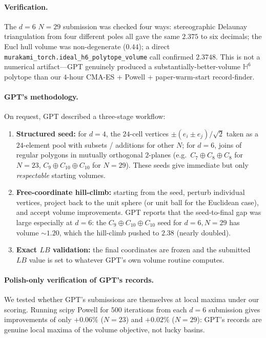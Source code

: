 \documentclass[11pt]{article}
\begin{document}
\paragraph{Verification.}
The $d = 6$ $N = 29$ submission was checked four ways: stereographic
Delaunay triangulation from four different poles all gave the same
$2.375$ to six decimals; the Eucl hull volume was non-degenerate
($0.44$); a direct \texttt{murakami\_torch.ideal\_h6\_polytope\_volume}
call confirmed $2.3748$.  This is not a numerical artifact---GPT
genuinely produced a substantially-better-volume $\mathbb{H}^6$
polytope than our $4$-hour CMA-ES + Powell + paper-warm-start
record-finder.

\paragraph{GPT's methodology.}
On request, GPT described a three-stage workflow:
\begin{enumerate}[label=(\arabic*)]
\item \textbf{Structured seed:} for $d = 4$, the
      $24$-cell vertices $\pm(e_i \pm e_j) / \sqrt{2}$ taken as a
      $24$-element pool with subsets / additions for other $N$;
      for $d = 6$, joins of regular polygons in mutually orthogonal
      $2$-planes (e.g.\ $C_7 \oplus C_8 \oplus C_8$ for $N = 23$,
      $C_9 \oplus C_{10} \oplus C_{10}$ for $N = 29$).  These seeds
      give immediate but only \emph{respectable} starting volumes.
\item \textbf{Free-coordinate hill-climb:} starting from the seed,
      perturb individual vertices, project back to the unit sphere
      (or unit ball for the Euclidean case), and accept volume
      improvements.  GPT reports that the seed-to-final gap was
      large especially at $d = 6$: the $C_9 \oplus C_{10} \oplus C_{10}$
      seed for $d = 6, N = 29$ has volume $\sim 1.20$, which the
      hill-climb pushed to $2.38$ (nearly doubled).
\item \textbf{Exact $LB$ validation:} the final coordinates are
      frozen and the submitted $LB$ value is set to whatever GPT's
      own volume routine computes.
\end{enumerate}

\paragraph{Polish-only verification of GPT's records.}
We tested whether GPT's submissions are themselves at local maxima
under our scoring.  Running scipy Powell for $500$ iterations from
each $d = 6$ submission gives improvements of only $+0.06\%$
($N = 23$) and $+0.02\%$ ($N = 29$): GPT's records are genuine
local maxima of the volume objective, not lucky basins.
\end{document}
